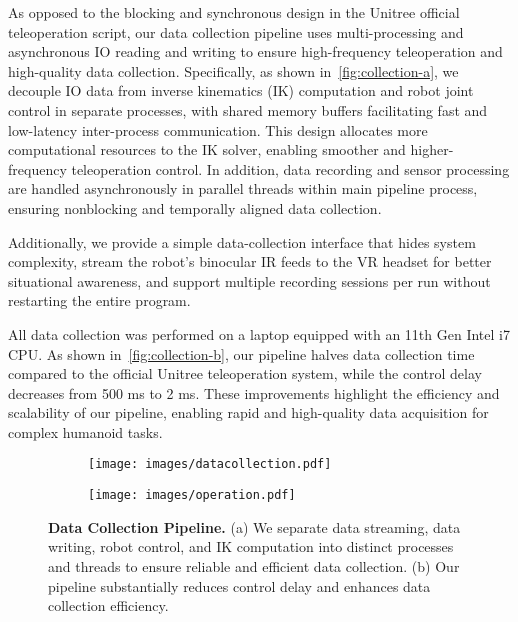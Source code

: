 \documentclass[letterpaper, 10pt, conference]{ieeeconf}
\begin{document}
As opposed to the blocking and synchronous design in the Unitree official teleoperation script, our data collection pipeline uses multi-processing and asynchronous IO reading and writing to ensure high-frequency teleoperation and high-quality data collection. Specifically, as shown in~\autoref{fig:collection-a}, we decouple IO data from inverse kinematics (IK) computation and robot joint control in separate processes, with shared memory buffers facilitating fast and low-latency inter-process communication. This design allocates more computational resources to the IK solver, enabling smoother and higher-frequency teleoperation control. In addition, data recording and sensor processing are handled asynchronously in parallel threads within main pipeline process, ensuring nonblocking and temporally aligned data collection.\par

Additionally, we provide a simple data-collection interface that hides system complexity, stream the robot’s binocular IR feeds to the VR headset for better situational awareness, and support multiple recording sessions per run without restarting the entire program.

All data collection was performed on a laptop equipped with an 11th Gen Intel i7 CPU. As shown in~\autoref{fig:collection-b}, our pipeline halves data collection time compared to the official Unitree teleoperation system, while the control delay decreases from 500 ms to 2 ms. These improvements highlight the efficiency and scalability of our pipeline, enabling rapid and high-quality data acquisition for complex humanoid tasks.


\begin{figure}[H]
  \centering
  \begin{subfigure}{\linewidth}
    \centering
    \texttt{[image: images/datacollection.pdf]}
    \caption{}
    \label{fig:collection-a}
  \end{subfigure}
  
  \begin{subfigure}{\linewidth}
    \centering
    \texttt{[image: images/operation.pdf]}
    \caption{}
    \label{fig:collection-b}
  \end{subfigure}

  \caption{\textbf{Data Collection Pipeline.} 
  (a) We separate data streaming, data writing, robot control, and IK computation into distinct processes and threads to ensure reliable and efficient data collection.  
  (b) Our pipeline substantially reduces control delay and enhances data collection efficiency.}
  \label{fig:collection}
\end{figure}
\end{document}
